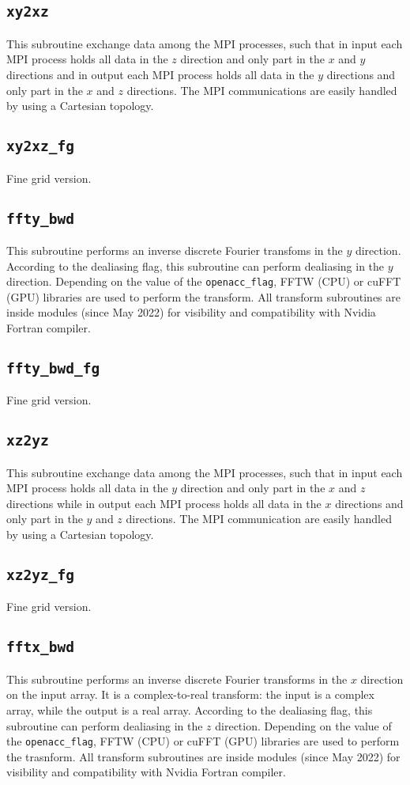 \subsection{\texttt{xy2xz}}
This subroutine exchange data among the MPI processes, such that in input each MPI process holds all data in the $z$ direction and only part in the $x$ and $y$ directions and in output each MPI process holds all data in the $y$ directions and only part in the $x$ and $z$ directions. The MPI communications are easily handled by using a Cartesian topology.

\subsection{\texttt{xy2xz\_fg}}
Fine grid version.

\subsection{\texttt{ffty\_bwd}}
This subroutine performs an inverse discrete Fourier transfoms in the $y$ direction. According to the dealiasing flag, this subroutine can perform dealiasing in the $y$ direction.
Depending on the value of the \texttt{openacc\_flag}, FFTW (CPU) or cuFFT (GPU) libraries are used to perform the transform.
All transform subroutines are inside modules (since May 2022) for visibility and compatibility with Nvidia Fortran compiler.

\subsection{\texttt{ffty\_bwd\_fg}}
Fine grid version.

\subsection{\texttt{xz2yz}}
This subroutine exchange data among the MPI processes, such that in input each MPI process holds all data in the $y$ direction and only part in the $x$ and $z$ directions while in output each MPI process holds all data in the $x$ directions and only part in the $y$ and $z$ directions. The MPI communication are easily handled by using a Cartesian topology.

\subsection{\texttt{xz2yz\_fg}}
Fine grid version.

\subsection{\texttt{fftx\_bwd}}
This subroutine performs an inverse discrete Fourier transforms in the $x$ direction on the input array. It is a complex-to-real transform: the input is a complex array, while the output is a real array. According to the dealiasing flag, this subroutine can perform dealiasing in the $z$ direction.
Depending on the value of the \texttt{openacc\_flag}, FFTW (CPU) or cuFFT (GPU) libraries are used to perform the trasnform.
All transform subroutines are inside modules (since May 2022) for visibility and compatibility with Nvidia Fortran compiler.

